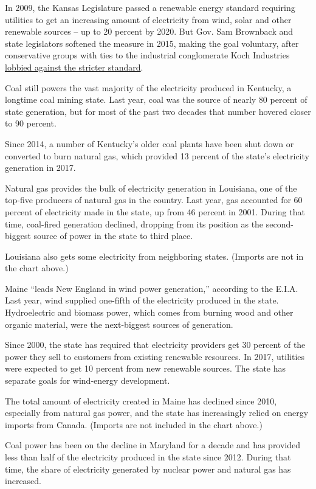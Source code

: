 In 2009, the Kansas Legislature passed a renewable energy standard
requiring utilities to get an increasing amount of electricity from
wind, solar and other renewable sources -- up to 20 percent by 2020. But
Gov. Sam Brownback and state legislators softened the measure in 2015,
making the goal voluntary, after conservative groups with ties to the
industrial conglomerate Koch Industries
\href{https://www.kansascity.com/news/politics-government/article20186187.html}{lobbied
against the stricter standard}.

Coal still powers the vast majority of the electricity produced in
Kentucky, a longtime coal mining state. Last year, coal was the source
of nearly 80 percent of state generation, but for most of the past two
decades that number hovered closer to 90 percent.

Since 2014, a number of Kentucky's older coal plants have been shut down
or converted to burn natural gas, which provided 13 percent of the
state's electricity generation in 2017.

Natural gas provides the bulk of electricity generation in Louisiana,
one of the top-five producers of natural gas in the country. Last year,
gas accounted for 60 percent of electricity made in the state, up from
46 percent in 2001. During that time, coal-fired generation declined,
dropping from its position as the second-biggest source of power in the
state to third place.

Louisiana also gets some electricity from neighboring states. (Imports
are not in the chart above.)

Maine ``leads New England in wind power generation,'' according to the
E.I.A. Last year, wind supplied one-fifth of the electricity produced in
the state. Hydroelectric and biomass power, which comes from burning
wood and other organic material, were the next-biggest sources of
generation.

Since 2000, the state has required that electricity providers get 30
percent of the power they sell to customers from existing renewable
resources. In 2017, utilities were expected to get 10 percent from new
renewable sources. The state has separate goals for wind-energy
development.

The total amount of electricity created in Maine has declined since
2010, especially from natural gas power, and the state has increasingly
relied on energy imports from Canada. (Imports are not included in the
chart above.)

Coal power has been on the decline in Maryland for a decade and has
provided less than half of the electricity produced in the state since
2012. During that time, the share of electricity generated by nuclear
power and natural gas has increased.


